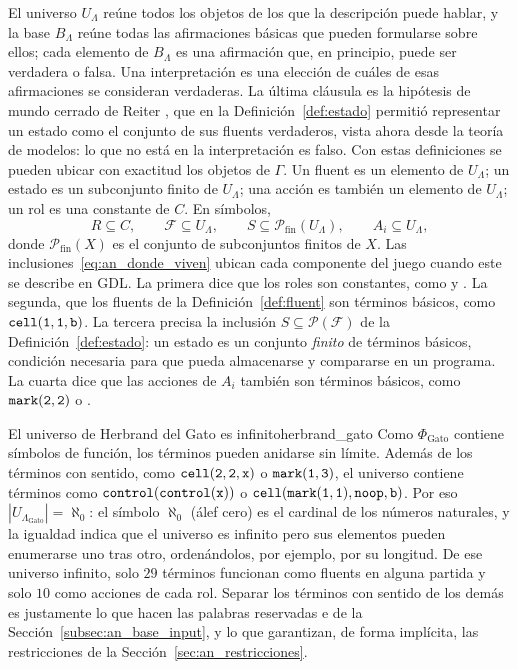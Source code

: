 El universo $U_\Lambda$ reúne todos los objetos de los que la descripción puede hablar, y la base $B_\Lambda$ reúne todas las afirmaciones básicas que pueden formularse sobre ellos; cada elemento de $B_\Lambda$ es una afirmación que, en principio, puede ser verdadera o falsa. Una interpretación es una elección de cuáles de esas afirmaciones se consideran verdaderas. La última cláusula es la hipótesis de mundo cerrado de Reiter \cite{Reiter1978CWA}, que en la Definición~\ref{def:estado} permitió representar un estado como el conjunto de sus fluents verdaderos, vista ahora desde la teoría de modelos: lo que no está en la interpretación es falso. Con estas definiciones se pueden ubicar con exactitud los objetos de $\Gamma$. Un fluent es un elemento de $U_\Lambda$; un estado es un subconjunto finito de $U_\Lambda$; una acción es también un elemento de $U_\Lambda$; un rol es una constante de $C$. En símbolos,
\begin{equation}
    R \subseteq C, \qquad \mathcal F \subseteq U_\Lambda, \qquad S \subseteq \mathcal P_{\mathrm{fin}}(U_\Lambda), \qquad A_i \subseteq U_\Lambda,
    \label{eq:an_donde_viven}
\end{equation}
donde $\mathcal P_{\mathrm{fin}}(X)$ es el conjunto de subconjuntos finitos de $X$. Las inclusiones~\eqref{eq:an_donde_viven} ubican cada componente del juego cuando este se describe en GDL. La primera dice que los roles son constantes, como  y . La segunda, que los fluents de la Definición~\ref{def:fluent} son términos básicos, como $\texttt{cell}(\texttt{1}, \texttt{1}, \texttt{b})$. La tercera precisa la inclusión $S \subseteq \mathcal P(\mathcal F)$ de la Definición~\ref{def:estado}: un estado es un conjunto \emph{finito} de términos básicos, condición necesaria para que pueda almacenarse y compararse en un programa. La cuarta dice que las acciones de $A_i$ también son términos básicos, como $\texttt{mark}(\texttt{2}, \texttt{2})$ o .

\begin{ejemplo}{El universo de Herbrand del Gato es infinito}{herbrand_gato}
Como $\Phi_{\text{Gato}}$ contiene símbolos de función, los términos pueden anidarse sin límite. Además de los términos con sentido, como $\texttt{cell}(\texttt{2}, \texttt{2}, \texttt{x})$ o $\texttt{mark}(\texttt{1}, \texttt{3})$, el universo contiene términos como $\texttt{control}(\texttt{control}(\texttt{x}))$ o $\texttt{cell}(\texttt{mark}(\texttt{1},\texttt{1}), \texttt{noop}, \texttt{b})$. Por eso $|U_{\Lambda_{\text{Gato}}}| = \aleph_0$: el símbolo $\aleph_0$ (álef cero) es el cardinal de los números naturales, y la igualdad indica que el universo es infinito pero sus elementos pueden enumerarse uno tras otro, ordenándolos, por ejemplo, por su longitud. De ese universo infinito, solo $29$ términos funcionan como fluents en alguna partida y solo $10$ como acciones de cada rol. Separar los términos con sentido de los demás es justamente lo que hacen las palabras reservadas  e  de la Sección~\ref{subsec:an_base_input}, y lo que garantizan, de forma implícita, las restricciones de la Sección~\ref{sec:an_restricciones}.
\end{ejemplo}

